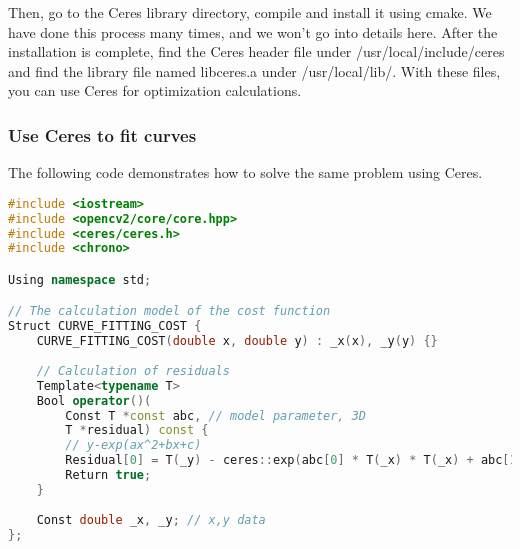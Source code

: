 Then, go to the Ceres library directory, compile and install it using cmake. We have done this process many times, and we won't go into details here. After the installation is complete, find the Ceres header file under /usr/local/include/ceres and find the library file named libceres.a under /usr/local/lib/. With these files, you can use Ceres for optimization calculations.
\subsubsection{Use Ceres to fit curves}
The following code demonstrates how to solve the same problem using Ceres.

\begin{lstlisting}[language=c++,caption=slambook/ch6/ceresCurveFitting.cpp]
#include <iostream>
#include <opencv2/core/core.hpp>
#include <ceres/ceres.h>
#include <chrono>

Using namespace std;

// The calculation model of the cost function
Struct CURVE_FITTING_COST {
    CURVE_FITTING_COST(double x, double y) : _x(x), _y(y) {}
    
    // Calculation of residuals
    Template<typename T>
    Bool operator()(
        Const T *const abc, // model parameter, 3D
        T *residual) const {
        // y-exp(ax^2+bx+c)
        Residual[0] = T(_y) - ceres::exp(abc[0] * T(_x) * T(_x) + abc[1] * T(_x) + abc[2]);
        Return true;
    }
    
    Const double _x, _y; // x,y data
};


\end{lstlisting}
